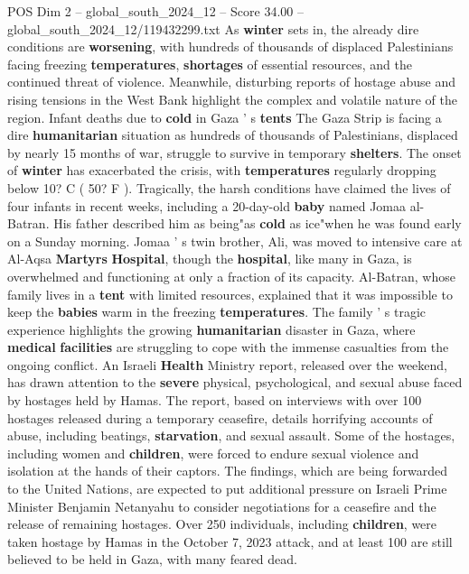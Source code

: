 \begin{textsample}{POS Dim 2 – global\_south\_2024\_12 – Score 34.00 – global\_south\_2024\_12/119432299.txt}  \label{ex:f2_pos_061}
As \textbf{winter} sets in, the already dire conditions are \textbf{worsening}, with hundreds of thousands of displaced Palestinians facing freezing \textbf{temperatures}, \textbf{shortages} of essential resources, and the continued threat of violence.
Meanwhile, disturbing reports of hostage abuse and rising tensions in the West Bank highlight the complex and volatile nature of the region.
Infant deaths due to \textbf{cold} in Gaza ' s \textbf{tents} The Gaza Strip is facing a dire \textbf{humanitarian} situation as hundreds of thousands of Palestinians, displaced by nearly 15 months of war, struggle to survive in temporary \textbf{shelters}.
The onset of \textbf{winter} has exacerbated the crisis, with \textbf{temperatures} regularly dropping below 10?
C ( 50?
F ).
Tragically, the harsh conditions have claimed the lives of four infants in recent weeks, including a 20-day-old \textbf{baby} named Jomaa al-Batran.
His father described him as being"as \textbf{cold} as ice"when he was found early on a Sunday morning.
Jomaa ' s twin brother, Ali, was moved to intensive care at Al-Aqsa \textbf{Martyrs} \textbf{Hospital}, though the \textbf{hospital}, like many in Gaza, is overwhelmed and functioning at only a fraction of its capacity.
Al-Batran, whose family lives in a \textbf{tent} with limited resources, explained that it was impossible to keep the \textbf{babies} warm in the freezing \textbf{temperatures}.
The family ' s tragic experience highlights the growing \textbf{humanitarian} disaster in Gaza, where \textbf{medical} \textbf{facilities} are struggling to cope with the immense casualties from the ongoing conflict.
An Israeli \textbf{Health} Ministry report, released over the weekend, has drawn attention to the \textbf{severe} physical, psychological, and sexual abuse faced by hostages held by Hamas.
The report, based on interviews with over 100 hostages released during a temporary ceasefire, details horrifying accounts of abuse, including beatings, \textbf{starvation}, and sexual assault.
Some of the hostages, including women and \textbf{children}, were forced to endure sexual violence and isolation at the hands of their captors.
The findings, which are being forwarded to the United Nations, are expected to put additional pressure on Israeli Prime Minister Benjamin Netanyahu to consider negotiations for a ceasefire and the release of remaining hostages.
Over 250 individuals, including \textbf{children}, were taken hostage by Hamas in the October 7, 2023 attack, and at least 100 are still believed to be held in Gaza, with many feared dead.

\end{textsample}
